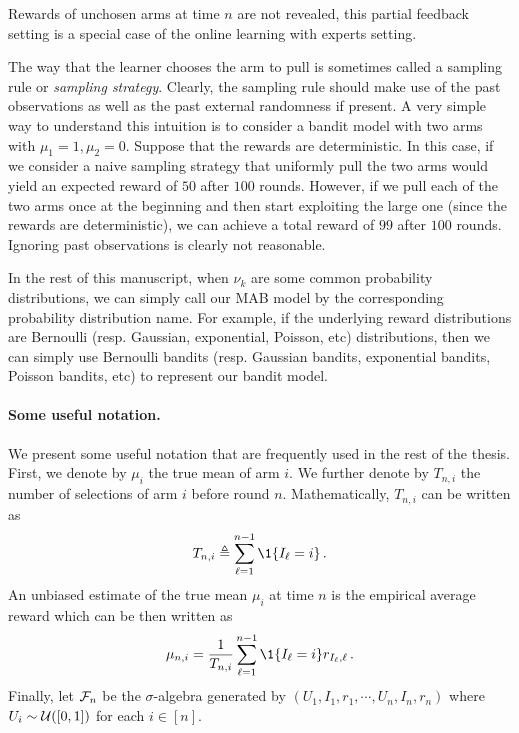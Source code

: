 \begin{remark}\label{remark:mab.partial}
\begin{leftbar}[remarkbar]
	Rewards of unchosen arms at time $n$ are not revealed, this partial feedback setting is a special case of the online learning with experts setting.
\end{leftbar}
\end{remark}

The way that the learner chooses the arm to pull is sometimes called a \gls{sampling rule} or \emph{sampling strategy}. Clearly, the sampling rule should make use of the past observations as well as the past external randomness if present. A very simple way to understand this intuition is to consider a bandit model with two arms with $\mu_1=1, \mu_2=0$. Suppose that the rewards are deterministic. In this case, if we consider a naive sampling strategy that uniformly pull the two arms would yield an expected reward of $50$ after $100$ rounds. However, if we pull each of the two arms once at the beginning and then start exploiting the large one (since the rewards are deterministic), we can achieve a total reward of $99$ after $100$ rounds. Ignoring past observations is clearly not reasonable.

In the rest of this manuscript, when $\nu_k$ are some common probability distributions, we can simply call our MAB model by the corresponding probability distribution name. For example, if the underlying reward distributions are Bernoulli (resp. Gaussian, exponential, Poisson, etc) distributions, then we can simply use Bernoulli bandits (resp. Gaussian bandits, exponential bandits, Poisson bandits, etc) to represent our bandit model. 

\paragraph{Some useful notation.}
We present some useful notation that are frequently used in the rest of the thesis. First, we denote by $\mu_i$ the true mean of arm $i$. We further denote by $T_{n,i}$ the number of selections of arm $i$ before round $n$. Mathematically, $T_{n,i}$ can be written as
\begin{align}\label{eq:mab.pulls}
    T_{n,i}\eqdef\sum_{\ell=1}^{n-1} \1{\{ I_{\ell} = i \}}\,.
\end{align}
An unbiased estimate of the true mean $\mu_i$ at time $n$ is the empirical average reward which can be then written as
\begin{align}\label{eq:mab.empirical_mean}
    \mu_{n,i}  = \frac{1}{T_{n,i}} \sum_{\ell=1}^{n-1} \1\{I_\ell = i\}r_{I_\ell,\ell}\,.
\end{align}
Finally, let $\mathcal{F}_n$ be the $\sigma$-algebra generated by $(U_1,I_1,r_1,\cdots,U_n,I_n,r_n)$ where $U_i\sim\mathcal{U}([0,1])$ for each $i\in[n]$.

